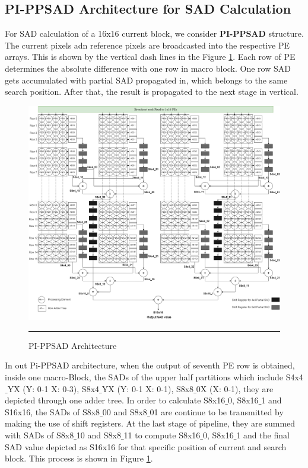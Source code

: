 \subsection{PI-PPSAD Architecture for SAD Calculation}

For SAD calculation of a 16x16 current block, we consider \textbf{PI-PPSAD} structure. The current pixels adn reference pixels are broadcasted into the respective PE arrays. This is shown by the vertical dash lines in the Figure \ref{fig:pippsad}. Each row of PE determines the absolute difference with one row in macro block. One row SAD gets accumulated with partial SAD propagated in, which belongs to the same search position. After that, the result is propagated to the next stage in vertical.

\begin{figure}[H]
	\centering
	\includegraphics[width = 5.5in]{./Figures/PIPPSAD.png}
	\rule{35em}{0.5pt}
	\caption{PI-PPSAD Architecture}
	\label{fig:pippsad}
\end{figure}

In out Pi-PPSAD architecture, when the output of seventh PE row is obtained, inside one macro-Block, the SADs of the upper half partitions which include S4x4$\_$YX (Y: 0-1 X: 0-3), S8x4$\_$YX (Y: 0-1 X: 0-1), S8x8$\_$0X (X: 0-1), they are depicted through one adder tree. In order to calculate S8x16$\_$0, S8x16$\_$1 and S16x16, the SADs of S8x8$\_$00 and S8x8$\_$01 are continue to be transmitted by making the use of shift registers. At the last stage of pipeline, they are summed with SADs of S8x8$\_$10 and S8x8$\_$11 to compute S8x16$\_$0, S8x16$\_$1 and the final SAD value depicted as S16x16 for that specific position of current and search block. This process is shown in Figure \ref{fig:pippsad}.

